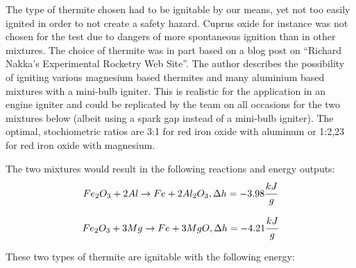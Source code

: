         The type of thermite chosen had to be ignitable by our means, yet not too easily ignited in order to not create a safety hazard. Cuprus oxide for instance was not chosen for the test due to dangers of more spontaneous ignition than in other mixtures. The choice of thermite was in part based on a blog post on “Richard Nakka’s Experimental Rocketry Web Site”\cite{thermite_types}. The author describes the possibility of igniting various magnesium based thermites and many aluminium based mixtures with a mini-bulb igniter. This is realistic for the application in an engine igniter and could be replicated by the team on all occasions for the two mixtures below (albeit using a spark gap instead of a mini-bulb igniter).
        The optimal, stochiometric ratios are 3:1 for red iron oxide with aluminum or 1:2,23 for red iron oxide with magnesium. \par
        The two mixtures would result in the following reactions and energy outputs:
        \begin{equation}
            Fe_2O_3 + 2Al \rightarrow Fe + 2Al_2O_3 , 
            \Delta h = -3.98 \cfrac{kJ}{g}
        \end{equation}

        \begin{equation}
            Fe_2O_3 + 3Mg \rightarrow Fe + 3MgO ,
            \Delta h = -4.21 \cfrac{kJ}{g}
        \end{equation}
   

        \par
        These two types of thermite are ignitable with the following energy: 

        
